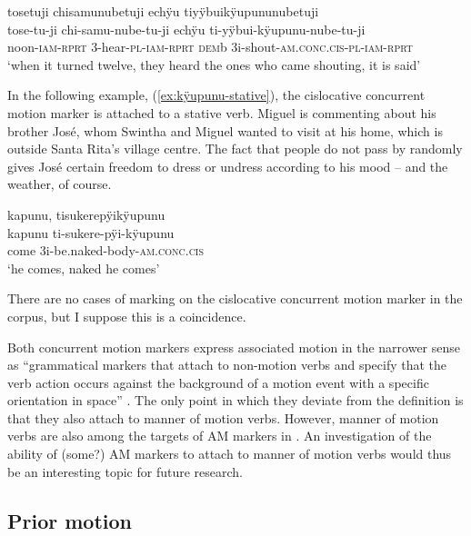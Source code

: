 \ea\label{ex:kÿupunu-non.mot-2}
\begingl 
\glpreamble tosetuji chisamunubetuji echÿu tiyÿbuikÿupununubetuji\\
\gla tose-tu-ji chi-samu-nube-tu-ji echÿu ti-yÿbui-kÿupunu-nube-tu-ji\\ 
\glb noon-\textsc{iam}-\textsc{rprt} 3-hear-\textsc{pl}-\textsc{iam}-\textsc{rprt} \textsc{dem}b 3i-shout-\textsc{am.conc.cis}-\textsc{pl}-\textsc{iam}-\textsc{rprt}\\ 
\glft ‘when it turned twelve, they heard the ones who came shouting, it is said’ \\ 
\endgl
\trailingcitation{[mxx-n151017l-1.86]}
\xe
 
In the following example, (\ref{ex:kÿupunu-stative}), the cislocative concurrent motion marker is attached to a stative verb. Miguel is commenting about his brother José, whom Swintha and Miguel wanted to visit at his home, which is outside Santa Rita’s village centre. The fact that people do not pass by randomly gives José certain freedom to dress or undress according to his mood – and the weather, of course.

\ea\label{ex:kÿupunu-stative}
\begingl 
\glpreamble kapunu, tisukerepÿikÿupunu\\
\gla kapunu ti-sukere-pÿi-kÿupunu\\ 
\glb come 3i-be.naked-body-\textsc{am.conc.cis}\\ 
\glft ‘he comes, naked he comes’\\ 
\endgl
\trailingcitation{[mox-c110926s-1.107]}
\xe

There are no cases of  marking on the cislocative concurrent motion marker in the corpus, but I suppose this is a coincidence.
 
Both concurrent motion markers express associated motion in the narrower sense as “grammatical markers that attach to non-motion verbs and specify that the verb action occurs against the background of a motion event with a specific orientation in space” \citep[131]{Guillaume2013}. The only point in which they deviate from the definition is that they also attach to  manner of motion verbs. However, manner of motion verbs are also among the targets of AM markers in  \citep[131]{Rose2015}. An investigation of the ability of (some?) AM markers to attach to  manner of motion verbs would thus be an interesting topic for future research.


\subsection{Prior motion}\label{sec:punu}

